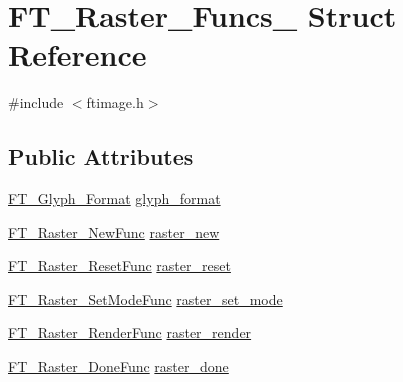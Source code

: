 \hypertarget{struct_f_t___raster___funcs__}{\section{F\-T\-\_\-\-Raster\-\_\-\-Funcs\-\_\- Struct Reference}
\label{struct_f_t___raster___funcs__}
}


{\ttfamily \#include $<$ftimage.\-h$>$}

\subsection*{Public Attributes}
\begin{DoxyCompactItemize}
\item 
\hyperlink{ftimage_8h_aeca0d10a27aedecbf96515e0628aff1f}{F\-T\-\_\-\-Glyph\-\_\-\-Format} \hyperlink{struct_f_t___raster___funcs___a741b43afa16f1f1b7f633cebd9f1d6a9}{glyph\-\_\-format}
\item 
\hyperlink{ftimage_8h_a485e0b35192d13220169b742bbba69c5}{F\-T\-\_\-\-Raster\-\_\-\-New\-Func} \hyperlink{struct_f_t___raster___funcs___a31c9df9af6636df8a17a11bcd921b6a4}{raster\-\_\-new}
\item 
\hyperlink{ftimage_8h_a9f117350ec9faab7a50df4b2a16960bc}{F\-T\-\_\-\-Raster\-\_\-\-Reset\-Func} \hyperlink{struct_f_t___raster___funcs___a91e9decd6066090a5f306f33f9815d39}{raster\-\_\-reset}
\item 
\hyperlink{ftimage_8h_ab1fd920fab26a7bd1192f91372fa6013}{F\-T\-\_\-\-Raster\-\_\-\-Set\-Mode\-Func} \hyperlink{struct_f_t___raster___funcs___a3b37c781e54cf933cb60f57f2d45b32c}{raster\-\_\-set\-\_\-mode}
\item 
\hyperlink{ftimage_8h_a56ad92be7f92489c25f4dbc4ff49f4d0}{F\-T\-\_\-\-Raster\-\_\-\-Render\-Func} \hyperlink{struct_f_t___raster___funcs___a7479a3def4522ce2667d6772e7bb96a5}{raster\-\_\-render}
\item 
\hyperlink{ftimage_8h_a02742716b0c8afc554e269797c869bf8}{F\-T\-\_\-\-Raster\-\_\-\-Done\-Func} \hyperlink{struct_f_t___raster___funcs___aecfd50bb6567d4442c997467cd68c857}{raster\-\_\-done}
\end{DoxyCompactItemize}


